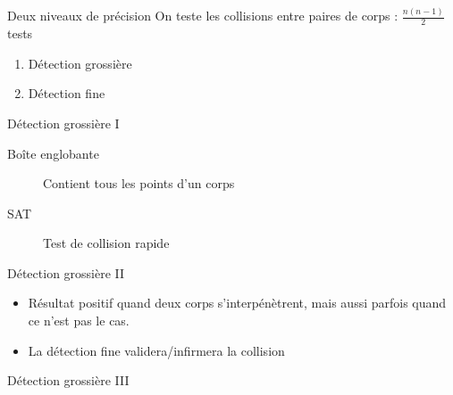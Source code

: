 \documentclass{beamer}
\begin{document}
\begin{frame}{Deux niveaux de précision}
  On teste les collisions entre paires de corps : $\frac{n(n-1)}{2}$ tests

  \begin{enumerate}
    \item Détection grossière
    \item Détection fine
  \end{enumerate}
\end{frame}

\begin{frame}{Détection grossière I}
  \begin{figure}
    \centering
    
  \end{figure}

  \begin{description}
    \item[Boîte englobante] Contient tous les points d'un corps
    \item[SAT] Test de collision rapide
  \end{description}
\end{frame}

\begin{frame}{Détection grossière II}
  \begin{figure}
    \centering
    
  \end{figure}

  \begin{itemize}
    \item Résultat positif quand deux corps s'interpénètrent, mais aussi parfois quand ce n'est pas le cas.
    \item La détection fine validera/infirmera la collision
  \end{itemize}
\end{frame}

\begin{frame}{Détection grossière III}
  \begin{figure}
    \centering
    
  \end{figure}
\end{frame}
\end{document}
